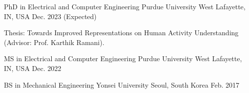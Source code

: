 


\begin{cventries}


    \cventry
    {PhD in Electrical and Computer Engineering} %
    {Purdue University} %
    {West Lafayette, IN, USA} %
    {Dec. 2023 (Expected)} %
    { %
    \begin{cvitems}
        \item {Thesis: Towards Improved Representations on Human Activity Understanding (Advisor: Prof. Karthik Ramani).}
    \end{cvitems}
    }

    \cventry
    {MS in Electrical and Computer Engineering} %
    {Purdue University} %
    {West Lafayette, IN, USA} %
    {Dec. 2022} %
    { %
    }
    \vspace{-1em}

    \cventry
    {BS in Mechanical Engineering} %
    {Yonsei University} %
    {Seoul, South Korea} %
    {Feb. 2017} %
    { %
    }
    \vspace{-1.5em}

\end{cventries}
